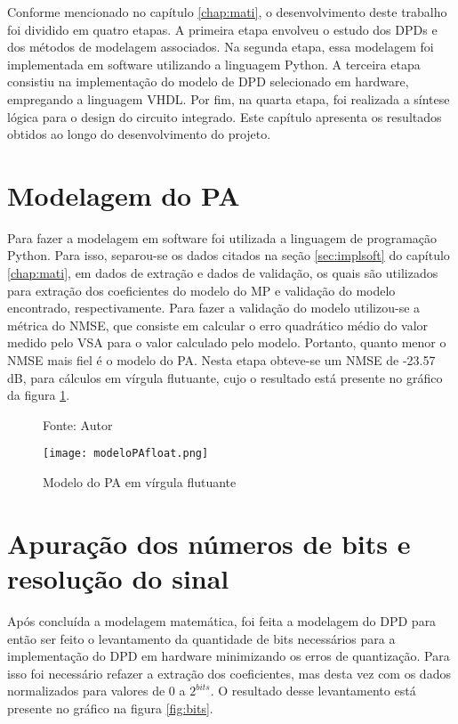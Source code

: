 Conforme mencionado no capítulo \ref{chap:mati}, o desenvolvimento deste trabalho foi dividido em quatro etapas. A primeira etapa envolveu o estudo dos DPDs e dos métodos de modelagem associados. Na segunda etapa, essa modelagem foi implementada em software utilizando a linguagem Python. A terceira etapa consistiu na implementação do modelo de DPD selecionado em hardware, empregando a linguagem VHDL. Por fim, na quarta etapa, foi realizada a síntese lógica para o design do circuito integrado. Este capítulo apresenta os resultados obtidos ao longo do desenvolvimento do projeto.

\section{Modelagem do PA}

Para fazer a modelagem em software foi utilizada a linguagem de programação Python. Para isso, separou-se os dados citados na seção \ref{sec:implsoft} do capítulo \ref{chap:mati}, em dados de extração e dados de validação, os quais são utilizados para extração dos coeficientes do modelo do MP e validação do modelo encontrado, respectivamente. Para fazer a validação do modelo utilizou-se a métrica do NMSE, que consiste em calcular o erro quadrático médio do valor medido pelo VSA para o valor calculado pelo modelo. Portanto, quanto menor o NMSE mais fiel é o modelo do PA. Nesta etapa obteve-se um NMSE de -23.57 dB, para cálculos em vírgula flutuante, cujo o resultado está presente no gráfico da figura \ref{fig:modelopafloat}.

\begin{figure}[htbp!]
    \centering
    \captionsetup{justification=centering}
    \caption*{Fonte: Autor}
    \texttt{[image: modeloPAfloat.png]}
    \caption{Modelo do PA em vírgula flutuante}
    \label{fig:modelopafloat}
\end{figure}

\section{Apuração dos números de bits e resolução do sinal} 

Após concluída a modelagem matemática, foi feita a modelagem do DPD para então ser feito o levantamento da quantidade de bits necessários para a implementação do DPD em hardware minimizando os erros de quantização. 
Para isso foi necessário refazer a extração dos coeficientes, mas desta vez com os dados normalizados para valores de 0 a $2^{bits}$.  
O resultado desse levantamento está presente no gráfico na figura \ref{fig:bits}.

